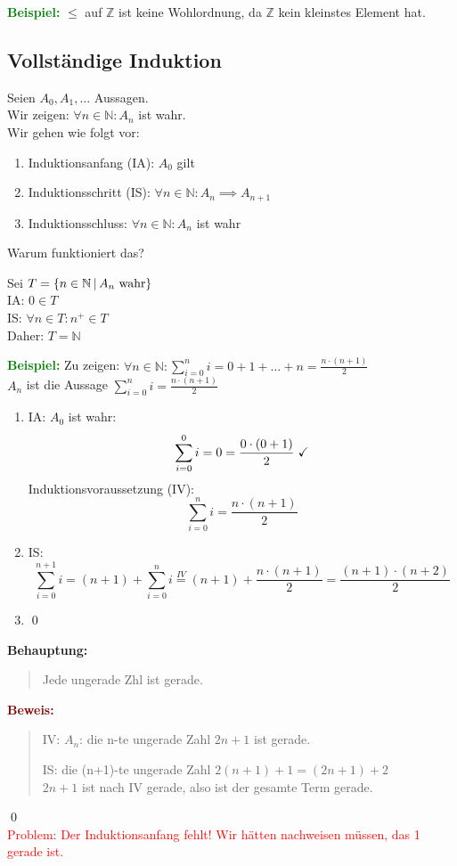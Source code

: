\documentclass{article}
\newcommand{\smsp}{\phantom{\hspace{3px}}}
\newcommand{\red}[1]{\textcolor{red}{#1}}
\newcommand{\green}[1]{\textcolor{green}{#1}}
\newcommand{\dgr}[1]{\textcolor{dgr}{#1}}
\newcommand{\maroon}[1]{\textcolor{maroon}{#1}}
\newcommand{\ex}{\green{\textbf{Beispiel: }}}
\newcommand{\cl}[1]{\dgr{\textbf{Behauptung: }}\begin{quote}#1\end{quote}}
\newcommand{\pr}[1]{\maroon{\textbf{Beweis: }}\begin{quote}#1\end{quote}\qed}
\newcommand{\N}{\mathbb{N}}
\newcommand{\Z}{\mathbb{Z}}
\newcommand{\vst}{\smsp \vline \smsp}
\begin{document}
\ex $\leq$ auf $\Z$ ist keine Wohlordnung, da $\Z$ kein kleinstes Element hat.

\newpage
\subsection{Vollständige Induktion}

Seien $A_0, A_1, \dots$ Aussagen.\\
Wir zeigen: $\forall n\in \N: A_n$ ist wahr.\\
Wir gehen wie folgt vor:
\begin{enumerate}
    \item Induktionsanfang (IA): $A_0$ gilt
    \item Induktionsschritt (IS): $\forall n \in \N: A_n \implies A_{n+1}$
    \item Induktionsschluss: $\forall n \in \N: A_n$ ist wahr
\end{enumerate}
Warum funktioniert das?

Sei $T = \{n \in \N \vst A_n \text{ wahr}\}$\\
IA: $0 \in T$\\
IS: $\forall n \in T: n^+ \in T$\\
Daher: $T = \N$

\ex Zu zeigen: \(\forall n \in \N: \sum_{i=0}^{n}i = 0+1+\dots+n = \frac{n \cdot (n+1)}{2}\)\\
$A_n$ ist die Aussage $\sum_{i = 0}^{n}i = \frac{n \cdot (n+1)}{2}$
\begin{enumerate}
    \item IA: $A_0$ ist wahr:
    \[
        \sum_{i = 0}^{0}i = 0 = \frac{0 \cdot (0 + 1)}{2} \smsp \checkmark
    \]
    Induktionsvoraussetzung (IV):
    \[
        \sum_{i = 0}^{n}i = \frac{n \cdot (n+1)}{2}
    \]
    \item IS:
    \[
        \sum_{i = 0}^{n + 1}i = (n+1) + \sum_{i = 0}^{n}i \overset{IV}{=} (n+1) + \frac{n \cdot (n+1)}{2} = \frac{(n+1) \cdot (n+2)}{2}
    \]
    \item \qed
\end{enumerate}

\cl{Jede ungerade Zhl ist gerade.}
\pr{
    IV: $A_n$: die n-te ungerade Zahl $2n + 1$ ist gerade.

    IS: die (n+1)-te ungerade Zahl $2 (n + 1) + 1 = (2n+1) + 2$\\
    $2n + 1$ ist nach IV gerade, also ist der gesamte Term gerade.
}\\
\red{
    Problem: Der Induktionsanfang fehlt! Wir hätten nachweisen müssen, das 1 gerade ist.
}
\end{document}
